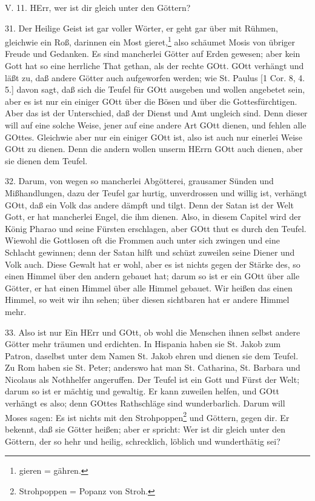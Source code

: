 \begin{schriftzitat}
V. 11. HErr, wer ist dir gleich unter den Göttern?
\end{schriftzitat}

31. Der Heilige Geist ist gar voller Wörter, er geht gar über mit Rühmen, gleichwie ein Roß, darinnen ein Most gieret,\footnote{gieren = gähren.} also schäumet Mosis von übriger Freude und Gedanken. Es sind mancherlei Götter auf Erden gewesen; aber kein Gott hat so eine herrliche That gethan, als der rechte GOtt. GOtt verhängt und läßt zu, daß andere Götter auch aufgeworfen werden; wie St. Paulus [1 Cor. 8, 4. 5.] davon sagt, daß sich die Teufel für GOtt ausgeben und wollen angebetet sein, aber es ist nur ein einiger GOtt über die Bösen und über die Gottesfürchtigen. Aber das ist der Unterschied, daß der Dienst und Amt ungleich sind. Denn dieser will auf eine solche Weise, jener auf eine andere Art GOtt dienen, und fehlen alle GOttes. Gleichwie aber nur ein einiger GOtt ist, also ist auch nur einerlei Weise GOtt zu dienen. Denn die andern wollen unserm HErrn GOtt auch dienen, aber sie dienen dem Teufel.

32. Darum, von wegen so mancherlei Abgötterei, grausamer Sünden und Mißhandlungen, dazu der Teufel gar hurtig, unverdrossen und willig ist, verhängt GOtt, daß ein Volk das andere dämpft und tilgt. Denn der Satan ist der Welt Gott, er hat mancherlei Engel, die ihm dienen. Also, in diesem Capitel wird der König Pharao und seine Fürsten erschlagen, aber GOtt thut es durch den Teufel. Wiewohl die Gottlosen oft die Frommen auch unter sich zwingen und eine Schlacht gewinnen; denn der Satan hilft und schüzt zuweilen seine Diener und Volk auch. Diese Gewalt hat er wohl, aber es ist nichts gegen der Stärke des, so einen Himmel über den andern gebauet hat; darum so ist er ein GOtt über alle Götter, er hat einen Himmel
über alle Himmel gebauet. Wir heißen das einen Himmel, so weit wir ihn sehen; über diesen sichtbaren hat er andere Himmel mehr.

33. Also ist nur Ein HErr und GOtt, ob wohl die Menschen ihnen selbst andere Götter mehr träumen und erdichten. In Hispania haben sie St. Jakob zum Patron, daselbst unter dem Namen St. Jakob ehren und dienen sie dem Teufel. Zu Rom haben sie St. Peter; anderswo hat man St. Catharina, St. Barbara und Nicolaus als Nothhelfer angeruffen. Der Teufel ist ein Gott und Fürst der Welt; darum so ist er mächtig und gewaltig. Er kann zuweilen helfen, und GOtt verhängt es also; denn GOttes Rathschläge sind wunderbarlich. Darum will Moses sagen: Es ist nichts mit den Strohpoppen\footnote{Strohpoppen = Popanz von Stroh.} und Göttern, gegen dir. Er bekennt, daß sie Götter heißen; aber er spricht: Wer ist dir gleich unter den Göttern, der so hehr und heilig, schrecklich, löblich und wunderthätig sei?

